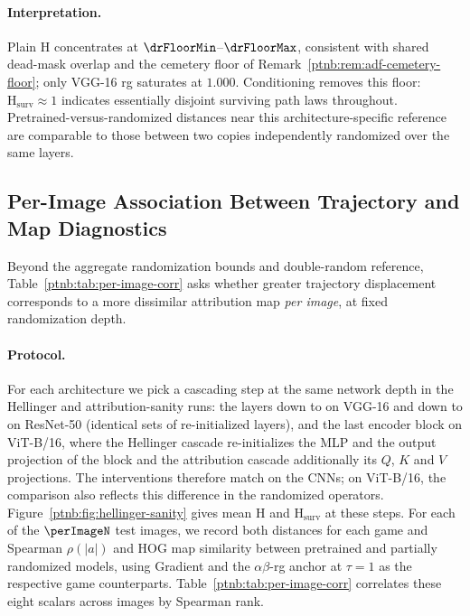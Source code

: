 \paragraph{Interpretation.}
Plain $\mathrm H$ concentrates at $\drFloorMin$--$\drFloorMax$, consistent with shared dead-mask overlap and the cemetery floor of Remark~\ref{ptnb:rem:adf-cemetery-floor}; only VGG-16 \ac{rg} saturates at $1.000$. Conditioning removes this floor: $\mathrm H_{\mathrm{surv}}\approx1$ indicates essentially disjoint surviving path laws throughout. Pretrained-versus-randomized distances near this architecture-specific reference are comparable to those between two copies independently randomized over the same layers.

\subsection{Per-Image Association Between Trajectory and Map Diagnostics}\label{ptnb:sec:per-image-orthogonality}

Beyond the aggregate randomization bounds and double-random reference, Table~\ref{ptnb:tab:per-image-corr} asks whether greater trajectory displacement corresponds to a more dissimilar attribution map \emph{per image}, at fixed randomization depth.

\paragraph{Protocol.}
For each architecture we pick a cascading step at the same network depth in the Hellinger
and attribution-sanity runs: the layers down to  on VGG-16 and down to
 on ResNet-50 (identical sets of re-initialized layers), and the last
encoder block on ViT-B/16, where the Hellinger cascade re-initializes the MLP and the output
projection of the block and the attribution cascade additionally its $Q$, $K$ and $V$ projections.
The interventions therefore match on the CNNs; on ViT-B/16, the comparison also reflects this
difference in the randomized operators.
Figure~\ref{ptnb:fig:hellinger-sanity} gives mean $\mathrm H$ and $\mathrm H_{\mathrm{surv}}$ at these steps. For each of the $\perImageN$ test images, we record both distances for each game and Spearman $\rho(|a|)$ and HOG map similarity between pretrained and partially randomized models, using Gradient and the $\alpha\beta$-\ac{rg} anchor at $\tau=1$ as the respective game counterparts. Table~\ref{ptnb:tab:per-image-corr} correlates these eight scalars across images by Spearman rank.

